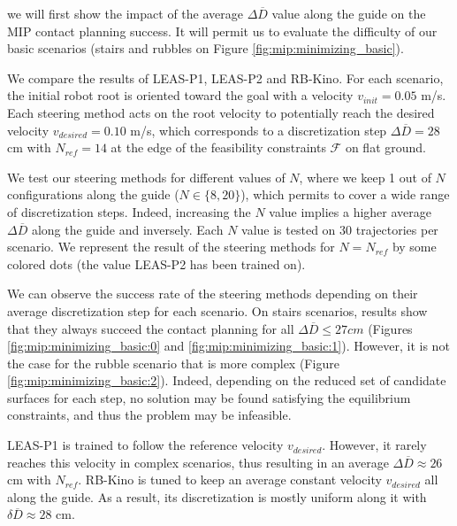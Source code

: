 we will first show the impact of the average $\Delta \overline{D}$ value along the guide on the MIP contact planning success. 
It will permit us to evaluate the difficulty of our basic scenarios (stairs and rubbles on Figure \ref{fig:mip:minimizing_basic}). 

We compare the results of LEAS-P1, LEAS-P2 and RB-Kino.
For each scenario, the initial robot root is oriented toward the goal with a velocity $v_{init}=0.05$ m/s.
Each steering method acts on the root velocity to potentially reach the desired velocity $v_{desired}=0.10$ m/s, which corresponds to a discretization step $\Delta \overline{D}=28$ cm with $N_{ref}=14$ at the edge of the feasibility constraints $\mathcal{F}$ on flat ground.

We test our steering methods for different values of $N$, where we keep 1 out of $N$ configurations along the guide ($N \in \{8,20\}$), which permits to cover a wide range of discretization steps.
Indeed, increasing the $N$ value implies a higher average $\Delta \overline{D}$ along the guide and inversely.
Each $N$ value is tested on 30 trajectories per scenario.
We represent the result of the steering methods for $N=N_{ref}$ by some colored dots (the value LEAS-P2 has been trained on).

We can observe the success rate of the steering methods depending on their average discretization step for each scenario.
On stairs scenarios, results show that they always succeed the contact planning for all $\Delta \overline{D} \leq 27 cm$ (Figures \ref{fig:mip:minimizing_basic:0} and \ref{fig:mip:minimizing_basic:1}).
However, it is not the case for the rubble scenario that is more complex (Figure \ref{fig:mip:minimizing_basic:2}). Indeed, depending on the reduced set of candidate surfaces for each step, no solution may be found satisfying the equilibrium constraints, and thus the problem may be infeasible.

LEAS-P1 is trained to follow the reference velocity $v_{desired}$.
However, it rarely reaches this velocity in complex scenarios, thus resulting in an average $\Delta \overline{D} \approx 26$ cm with $N_{ref}$.
RB-Kino is tuned to keep an average constant velocity $v_{desired}$ all along the guide. As a result, its discretization is mostly uniform along it with $\delta \overline{D} \approx 28$ cm.

